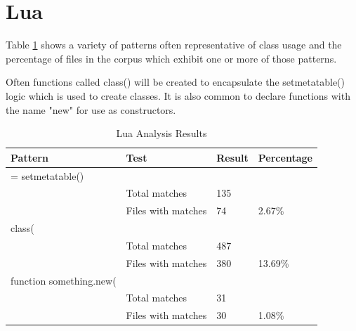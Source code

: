 \section{Lua}
Table \ref{LuaResults} shows a variety of patterns often representative of class usage and the percentage of files in the corpus which exhibit one or more of those patterns.\newline

Often functions called class() will be created to encapsulate the setmetatable() logic which is used to create classes. It is also common to declare functions with the name "new" for use as constructors.

\begin{table}[]
	\centering
	\caption{Lua Analysis Results}
	\label{LuaResults}
	\begin{tabular}{|l|l|l|l|}
		\hline
		Pattern                 & Test               & Result & Percentage \\ \hline
		= setmetatable()        &                    &        &            \\ \hline
		& Total matches      & 135    &            \\ \hline
		& Files with matches & 74     & 2.67\%     \\ \hline
		class(                  &                    &        &            \\ \hline
		& Total matches      & 487    &            \\ \hline
		& Files with matches & 380    & 13.69\%    \\ \hline
		function something.new( &                    &        &            \\ \hline
		& Total matches      & 31     &            \\ \hline
		& Files with matches & 30     & 1.08\%     \\ \hline
	\end{tabular}
\end{table}